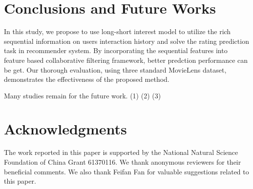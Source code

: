 \documentclass{sig-alternate-05-2015}
\begin{document}
\section{Conclusions and Future Works}
In this study, we propose to use long-short interest model to utilize the rich
sequential information on users interaction history and solve the rating
prediction task in recommender system.
By incorporating the sequential features into feature based collaborative
filtering framework, better predction performance can be get.
Our thorough evaluation, using three standard MovieLens dataset, demonstrates the
effectiveness of the proposed method.

Many studies remain for the future work.
(1)
(2)
(3)

\section{Acknowledgments}
The work reported in this paper is supported by the National Natural
Science Foundation of China Grant 61370116. We thank anonymous reviewers for
their beneficial comments. We also thank Feifan Fan for valuable suggestions
related to this paper.



\end{document}
